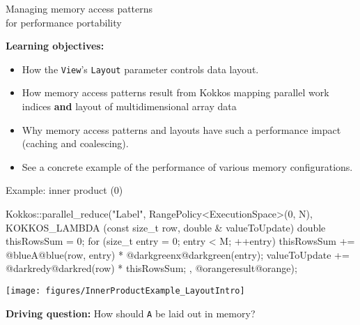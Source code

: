 \begin{frame}[fragile]

  {\huge Managing memory access patterns \\ for performance portability}

  \vspace{20pt}

  \textbf{Learning objectives:}
  \begin{itemize}
    \item{How the \texttt{View}'s \texttt{Layout} parameter controls data layout.}
    \item{How memory access patterns result from Kokkos mapping parallel work indices \textbf{and} layout of multidimensional array data}
    \item{Why memory access patterns and layouts have such a performance impact (caching and coalescing).}
    \item{See a concrete example of the performance of various memory configurations.}
  \end{itemize}

  \vspace{-20pt}

\end{frame}


\begin{frame}[fragile]{Example: inner product (0)}

  \begin{code}[keywords={}]
Kokkos::parallel_reduce("Label", 
  RangePolicy<ExecutionSpace>(0, N),
  KOKKOS_LAMBDA (const size_t row, double & valueToUpdate) {
    double thisRowsSum = 0;
    for (size_t entry = 0; entry < M; ++entry) {
      thisRowsSum += @blueA@blue(row, entry) * @darkgreenx@darkgreen(entry);
    }
    valueToUpdate += @darkredy@darkred(row) * thisRowsSum;
  }, @orangeresult@orange);
  \end{code}

  \vspace{-20pt}

  \begin{center}
    \texttt{[image: figures/InnerProductExample\_LayoutIntro]}
  \end{center}

  \pause
  \vspace{-8pt}

 \textbf{Driving question:} How should {\color{blue}\texttt{A}} be laid out in memory?

  \vspace{8pt}

\end{frame}

